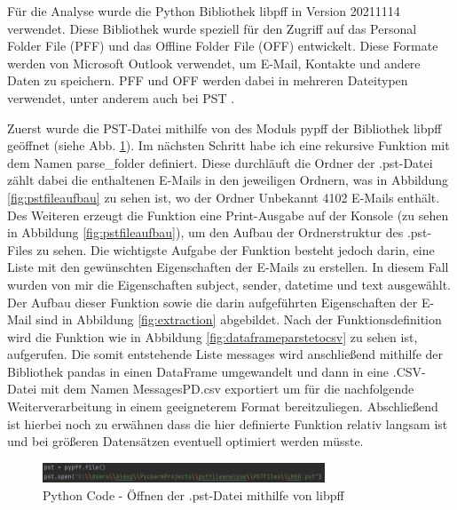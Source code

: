 Für die Analyse wurde die Python Bibliothek \glqq{}libpff\grqq{} in Version 20211114 verwendet. Diese Bibliothek wurde speziell für den Zugriff auf das Personal Folder File (PFF) und das Offline Folder File (OFF) entwickelt. Diese Formate werden von Microsoft Outlook verwendet, um E-Mail, Kontakte und andere Daten zu speichern. PFF und OFF werden dabei in mehreren Dateitypen verwendet, unter anderem auch bei PST \cite{GitHub.26.06.2022}.

Zuerst wurde die PST-Datei mithilfe von des Moduls pypff der Bibliothek libpff geöffnet (siehe Abb. \ref{fig:fileopen}). Im nächsten Schritt habe ich eine rekursive Funktion mit dem Namen parse\_folder definiert. Diese durchläuft die Ordner der .pst-Datei zählt dabei die enthaltenen E-Mails in den jeweiligen Ordnern, was in Abbildung \ref{fig:pstfileaufbau} zu sehen ist, wo der Ordner Unbekannt 4102 E-Mails enthält. Des Weiteren erzeugt die Funktion eine Print-Ausgabe auf der Konsole (zu sehen in Abbildung \ref{fig:pstfileaufbau}), um den Aufbau der Ordnerstruktur des .pst-Files zu sehen. Die wichtigste Aufgabe der Funktion besteht jedoch darin, eine Liste mit den gewünschten Eigenschaften der E-Mails zu erstellen. In diesem Fall wurden von mir die Eigenschaften \glqq{}subject\grqq{}, \glqq{}sender\grqq{}, \glqq{}datetime\grqq{} und \glqq{}text\grqq{} ausgewählt. Der Aufbau dieser Funktion sowie die darin aufgeführten Eigenschaften der E-Mail sind in Abbildung \ref{fig:extraction} abgebildet. Nach der Funktionsdefinition wird die Funktion wie in Abbildung \ref{fig:dataframeparstetocsv} zu sehen ist, aufgerufen. Die somit entstehende Liste \glqq{}messages\grqq{} wird anschließend mithilfe der Bibliothek pandas in einen DataFrame umgewandelt und dann in eine .CSV-Datei mit dem Namen \glqq{}MessagesPD.csv\grqq{} exportiert um für die nachfolgende Weiterverarbeitung in einem geeigneterem Format bereitzuliegen. Abschließend ist hierbei noch zu erwähnen dass die hier definierte Funktion relativ langsam ist und bei größeren Datensätzen eventuell optimiert werden müsste.

\begin{figure}
    \centering
    \includegraphics[width=0.75\textwidth]{images/File_open_libpff.PNG}
    \caption{Python Code - Öffnen der .pst-Datei mithilfe von libpff} 
    \label{fig:fileopen}
\end{figure}

